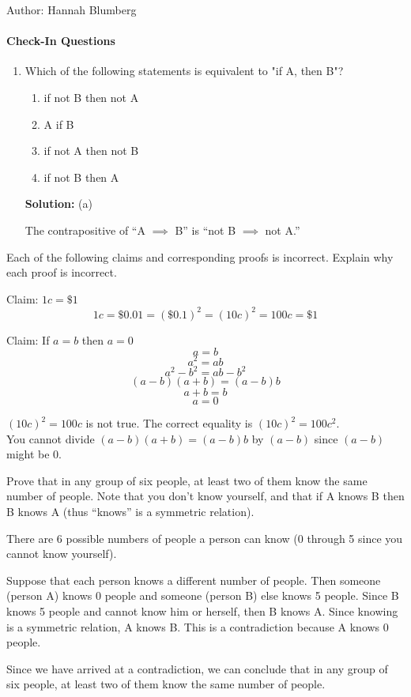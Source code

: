 \documentclass[solution, letterpaper]{cs20inclass}
\begin{document}

\noindent Author: Hannah Blumberg%

\paragraph*{Check-In Questions}
\begin{enumerate}
\item Which of the following statements is equivalent to "if A, then B"?
\begin{enumerate}
\item	if not B then not A
\item	A if B
\item	if not A then not B
\item	if not B then A
\end{enumerate}

\textbf{Solution:} (a)

The contrapositive of ``A $\implies$ B'' is ``not B $\implies$ not A.''

\end{enumerate}

\problem

Each of the following claims and corresponding proofs is incorrect. Explain why each proof is incorrect.

\subproblem Claim: $1c = \$1$   \[ 1c = \$0.01= (\$ 0.1)^2 = (10c)^2 = 100c =\$1 \]

\subproblem Claim: If $a=b$ then $a=0$\\ \[a=b\]\[a^2=ab\]\[a^2-b^2=ab-b^2\]\[(a-b)(a+b)=(a-b)b\]\[a+b=b\]\[a=0\]

\begin{solution}
  \subsolution $(10c)^2 = 100c$ is not true. The correct equality is $(10c)^2 = 100c^2$.
  \\
  \subsolution You cannot divide $(a-b)(a+b) = (a-b)b$ by $(a-b)$ since $(a-b)$ might be 0.
\end{solution}

\problem

Prove that in any group of six people, at least two of them know the same number of people. Note that you don't know yourself, and that if A knows B then B knows A (thus ``knows'' is a symmetric relation). 

\begin{solution}

There are 6 possible numbers of people a person can know (0 through 5 since you cannot know yourself).

Suppose that each person knows a different number of people. Then someone (person A) knows 0 people and someone (person B) else knows 5 people. Since B knows 5 people and cannot know him or herself, then B knows A. Since knowing is a symmetric relation, A knows B. This is a contradiction because A knows 0 people.

Since we have arrived at a contradiction, we can conclude that in any group of six people, at least two of them know the same number of people.

\end{solution}
\end{document}

